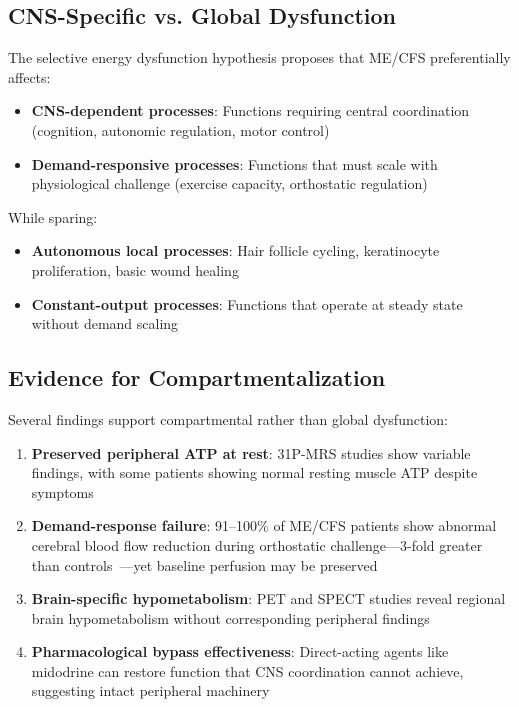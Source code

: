 \subsection{CNS-Specific vs. Global Dysfunction}

The selective energy dysfunction hypothesis proposes that ME/CFS preferentially affects:

\begin{itemize}
    \item \textbf{CNS-dependent processes}: Functions requiring central coordination (cognition, autonomic regulation, motor control)
    \item \textbf{Demand-responsive processes}: Functions that must scale with physiological challenge (exercise capacity, orthostatic regulation)
\end{itemize}

While sparing:

\begin{itemize}
    \item \textbf{Autonomous local processes}: Hair follicle cycling, keratinocyte proliferation, basic wound healing
    \item \textbf{Constant-output processes}: Functions that operate at steady state without demand scaling
\end{itemize}

\subsection{Evidence for Compartmentalization}

Several findings support compartmental rather than global dysfunction:

\begin{enumerate}
    \item \textbf{Preserved peripheral ATP at rest}: 31P-MRS studies show variable findings, with some patients showing normal resting muscle ATP despite symptoms
    \item \textbf{Demand-response failure}: 91--100\% of ME/CFS patients show abnormal cerebral blood flow reduction during orthostatic challenge---3-fold greater than controls~\cite{Novak2022}---yet baseline perfusion may be preserved
    \item \textbf{Brain-specific hypometabolism}: PET and SPECT studies reveal regional brain hypometabolism without corresponding peripheral findings~\cite{Nakatomi2014neuroinflammation}
    \item \textbf{Pharmacological bypass effectiveness}: Direct-acting agents like midodrine can restore function that CNS coordination cannot achieve, suggesting intact peripheral machinery
\end{enumerate}

